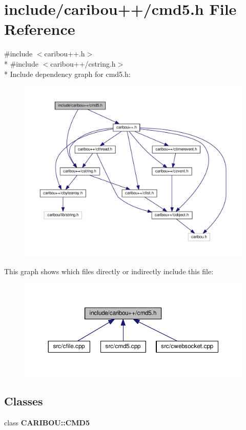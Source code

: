 \section{include/caribou++/cmd5.h File Reference}
\label{cmd5_8h}
{\ttfamily \#include $<$caribou++.\-h$>$}\\*
{\ttfamily \#include $<$caribou++/cstring.\-h$>$}\\*
Include dependency graph for cmd5.\-h\-:\nopagebreak
\begin{figure}[H]
\begin{center}
\leavevmode
\includegraphics[width=350pt]{cmd5_8h__incl}
\end{center}
\end{figure}
This graph shows which files directly or indirectly include this file\-:\nopagebreak
\begin{figure}[H]
\begin{center}
\leavevmode
\includegraphics[width=350pt]{cmd5_8h__dep__incl}
\end{center}
\end{figure}
\subsection*{Classes}
\begin{DoxyCompactItemize}
\item 
class {\bf C\-A\-R\-I\-B\-O\-U\-::\-C\-M\-D5}
\end{DoxyCompactItemize}
